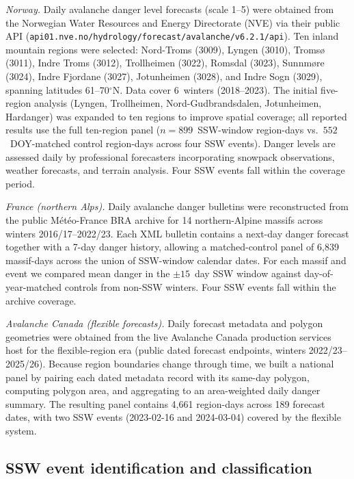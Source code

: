 \documentclass[11pt,letterpaper]{article}
\begin{document}
\textit{Norway.} Daily avalanche danger level forecasts (scale 1--5) were obtained from the Norwegian Water Resources and Energy Directorate (NVE) via their public API (\texttt{api01.nve.no/hydrology/forecast/avalanche/v6.2.1/api}). Ten inland mountain regions were selected: Nord-Troms (3009), Lyngen (3010), Troms{\o} (3011), Indre Troms (3012), Trollheimen (3022), Romsdal (3023), Sunnm{\o}re (3024), Indre Fjordane (3027), Jotunheimen (3028), and Indre Sogn (3029), spanning latitudes 61--70$^\circ$N. Data cover 6~winters (2018--2023). The initial five-region analysis (Lyngen, Trollheimen, Nord-Gudbrandsdalen, Jotunheimen, Hardanger) was expanded to ten regions to improve spatial coverage; all reported results use the full ten-region panel ($n = 899$~SSW-window region-days vs.\ $552$~DOY-matched control region-days across four SSW events). Danger levels are assessed daily by professional forecasters incorporating snowpack observations, weather forecasts, and terrain analysis. Four SSW events fall within the coverage period.

\textit{France (northern Alps).} Daily avalanche danger bulletins were reconstructed from the public M\'et\'eo-France BRA archive for 14 northern-Alpine massifs across winters 2016/17--2022/23. Each XML bulletin contains a next-day danger forecast together with a 7-day danger history, allowing a matched-control panel of 6{,}839 massif-days across the union of SSW-window calendar dates. For each massif and event we compared mean danger in the $\pm 15$~day SSW window against day-of-year-matched controls from non-SSW winters. Four SSW events fall within the archive coverage.

\textit{Avalanche Canada (flexible forecasts).} Daily forecast metadata and polygon geometries were obtained from the live Avalanche Canada production services host for the flexible-region era (public dated forecast endpoints, winters 2022/23--2025/26). Because region boundaries change through time, we built a national panel by pairing each dated metadata record with its same-day polygon, computing polygon area, and aggregating to an area-weighted daily danger summary. The resulting panel contains 4{,}661 region-days across 189 forecast dates, with two SSW events (2023-02-16 and 2024-03-04) covered by the flexible system.

\subsection{SSW event identification and classification}
\end{document}
